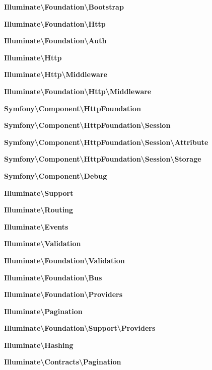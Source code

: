 \begin{DoxyCompactItemize}
\item 
 {\bf Illuminate\textbackslash{}\+Foundation\textbackslash{}\+Bootstrap}
\item 
 {\bf Illuminate\textbackslash{}\+Foundation\textbackslash{}\+Http}
\item 
 {\bf Illuminate\textbackslash{}\+Foundation\textbackslash{}\+Auth}
\item 
 {\bf Illuminate\textbackslash{}\+Http}
\item 
 {\bf Illuminate\textbackslash{}\+Http\textbackslash{}\+Middleware}
\item 
 {\bf Illuminate\textbackslash{}\+Foundation\textbackslash{}\+Http\textbackslash{}\+Middleware}
\item 
 {\bf Symfony\textbackslash{}\+Component\textbackslash{}\+Http\+Foundation}
\item 
 {\bf Symfony\textbackslash{}\+Component\textbackslash{}\+Http\+Foundation\textbackslash{}\+Session}
\item 
 {\bf Symfony\textbackslash{}\+Component\textbackslash{}\+Http\+Foundation\textbackslash{}\+Session\textbackslash{}\+Attribute}
\item 
 {\bf Symfony\textbackslash{}\+Component\textbackslash{}\+Http\+Foundation\textbackslash{}\+Session\textbackslash{}\+Storage}
\item 
 {\bf Symfony\textbackslash{}\+Component\textbackslash{}\+Debug}
\item 
 {\bf Illuminate\textbackslash{}\+Support}
\item 
 {\bf Illuminate\textbackslash{}\+Routing}
\item 
 {\bf Illuminate\textbackslash{}\+Events}
\item 
 {\bf Illuminate\textbackslash{}\+Validation}
\item 
 {\bf Illuminate\textbackslash{}\+Foundation\textbackslash{}\+Validation}
\item 
 {\bf Illuminate\textbackslash{}\+Foundation\textbackslash{}\+Bus}
\item 
 {\bf Illuminate\textbackslash{}\+Foundation\textbackslash{}\+Providers}
\item 
 {\bf Illuminate\textbackslash{}\+Pagination}
\item 
 {\bf Illuminate\textbackslash{}\+Foundation\textbackslash{}\+Support\textbackslash{}\+Providers}
\item 
 {\bf Illuminate\textbackslash{}\+Hashing}
\item 
 {\bf Illuminate\textbackslash{}\+Contracts\textbackslash{}\+Pagination}
\item 

\end{DoxyCompactItemize}
